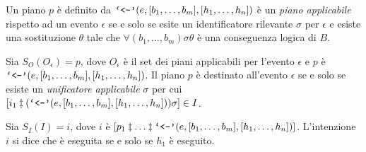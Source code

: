 \smallskip
\begin{defn}
Un piano $p$ è definito da $\text{\text{\texttt{`<-'}}}(e, [b_1, \ldots, b_m], [h_1, \ldots, h_n])$ è un \textit{piano applicabile} rispetto ad un evento $\epsilon$ se e solo se esite un identificatore rilevante $\sigma$ per $\epsilon$ e esiste una sostituzione $\theta$ tale che $\forall (b_1, \ldots, b_m) \sigma\theta$ è una conseguenza logica di $B$.
\end{defn}

\smallskip
\begin{defn}
Sia $S_O(O_\epsilon) = p$, dove $O_\epsilon$ è il set dei piani applicabili per l'evento $\epsilon$ e $p$ è $\text{\text{\texttt{`<-'}}}(e, [b_1, \ldots, b_m], [h_1, \ldots, h_n])$. Il piano $p$ è destinato all'evento $\epsilon$ se e solo se esiste un \textit{unificatore applicabile} $\sigma$ per cui $[i_1 \ddagger (\text{\text{\texttt{`<-'}}}(e, [b_1, \ldots, b_m], [h_1, \ldots, h_n])) \sigma] \in I$.
\end{defn}

\smallskip
\begin{defn}
Sia $S_I(I) = i$, dove $i$ è $[p_1 \ddagger \ldots \ddagger \text{\text{\texttt{`<-'}}}(e, [b_1, \ldots, b_m], [h_1, \ldots, h_n])]$. L'intenzione $i$ si dice che è eseguita se e solo se $h_1$ è eseguito.
\end{defn}

%
%
%

